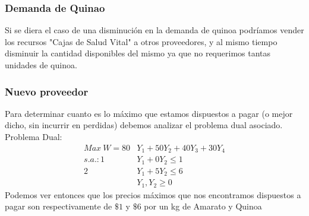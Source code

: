 \begin{homeworkProblem}
\subsubsection{Demanda de Quinao}
Si se diera el caso de una disminución en la demanda de quinoa podríamos vender los recursos "Cajas de Salud Vital" a otros proveedores, y al mismo tiempo disminuir la cantidad disponibles del mismo ya que no requerimos tantas unidades de quinoa.
\subsubsection{Nuevo proveedor}
Para determinar cuanto es lo máximo que estamos dispuestos a pagar (o mejor dicho, sin incurrir en perdidas) debemos analizar el problema dual asociado.
Problema Dual:
\begin{align*}
    Max\ W = 80&Y_1 + 50Y_2 + 40Y_3 + 30Y_4 \\
    s.a.: 1&Y_1 + 0Y_2 \le 1 \\
    2&Y_1 + 5Y_2 \le 6 \\
    &Y_1,Y_2 \ge 0
\end{align*}
Podemos ver entonces que los precios máximos que nos encontramos dispuestos a pagar son respectivamente de $\$1$ y $\$6$ por un kg de Amarato y Quinoa
\end{homeworkProblem}